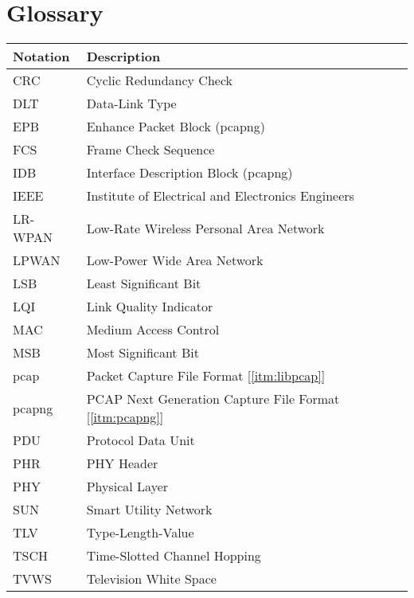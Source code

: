 \documentclass[12pt]{article}
\renewcommand\_{\textunderscore\allowbreak}
\begin{document}
\newpage
\section{Glossary}\label{sec:glos}
\begin{center}
\begin{tabular}{ |p{3cm}|p{10cm}| }
\hline
\textbf{Notation}   &  \textbf{Description}\\
\hline
CRC                 &  Cyclic Redundancy Check\\
\hline
DLT                 &  Data-Link Type\\
\hline
EPB                 &  Enhance Packet Block (pcapng)\\
\hline
FCS                 &  Frame Check Sequence\\
\hline
IDB                 &  Interface Description Block (pcapng)\\
\hline
IEEE                &  Institute of Electrical and Electronics Engineers\\
\hline
LR-WPAN             &  Low-Rate Wireless Personal Area Network\\
\hline
LPWAN               &  Low-Power Wide Area Network\\
\hline
LSB                 &  Least Significant Bit\\
\hline
LQI                 &  Link Quality Indicator\\
\hline
MAC                 &  Medium Access Control\\
\hline
MSB                 &  Most Significant Bit\\
\hline
pcap                &  Packet Capture File Format [\ref{itm:libpcap}]\\
\hline
pcapng              &  PCAP Next Generation Capture File Format [\ref{itm:pcapng}]\\
\hline
PDU                 &  Protocol Data Unit\\
\hline
PHR                 &  PHY Header\\
\hline
PHY                 &  Physical Layer\\
\hline
SUN                 &  Smart Utility Network\\
\hline
TLV                 &  Type-Length-Value\\
\hline
TSCH                &  Time-Slotted Channel Hopping\\
\hline
TVWS                &  Television White Space\\
\hline
\end{tabular}
\end{center}
\end{document}
